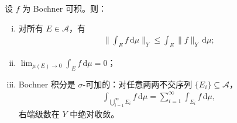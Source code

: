 \documentclass[../../main.tex]{subfiles}%
\begin{document}
\begin{proposition}\label{proposition:ch04-Bochner性质}
设 $f$ 为 Bochner 可积。则：
\begin{enumerate}[(i)]
\item\label{item:ch04-Bochner性质-i} 对所有 $E\in\mathcal{A}$，有
\begin{align}
\Big\|\int_E f\,\mathrm{d}\mu\Big\|_Y\leqslant\int_E\|f\|_Y\,\mathrm{d}\mu; \label{align:ch04-4.38}
\end{align}
\item\label{item:ch04-Bochner性质-ii} $\lim_{\mu(E)\to0}\int_E f\,\mathrm{d}\mu=0$；
\item\label{item:ch04-Bochner性质-iii} Bochner 积分是 $\sigma$-可加的：对任意两两不交序列 $\{E_i\}\subseteq\mathcal{A}$，
\begin{align}
\int_{\bigcup_{i=1}^\infty E_i}f\,\mathrm{d}\mu=\sum_{i=1}^\infty\int_{E_i}f\,\mathrm{d}\mu, \label{align:ch04-4.39}
\end{align}
右端级数在 $Y$ 中绝对收敛。
\end{enumerate}
\end{proposition}
\end{document}
